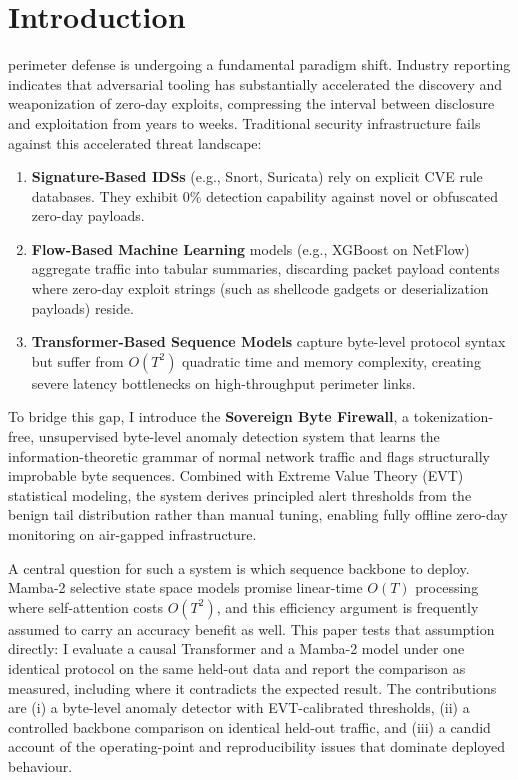\documentclass[10pt,journal,compsoc]{IEEEtran}
\begin{document}
\maketitle
\IEEEdisplaynontitleabstractindextext
\IEEEpeerreviewmaketitle

\section{Introduction}
 perimeter defense is undergoing a fundamental paradigm shift. Industry reporting indicates that adversarial tooling has substantially accelerated the discovery and weaponization of zero-day exploits, compressing the interval between disclosure and exploitation from years to weeks. Traditional security infrastructure fails against this accelerated threat landscape:

\begin{enumerate}
    \item \textbf{Signature-Based IDSs} (e.g., Snort, Suricata) rely on explicit CVE rule databases. They exhibit $0\%$ detection capability against novel or obfuscated zero-day payloads.
    \item \textbf{Flow-Based Machine Learning} models (e.g., XGBoost on NetFlow) aggregate traffic into tabular summaries, discarding packet payload contents where zero-day exploit strings (such as shellcode gadgets or deserialization payloads) reside.
    \item \textbf{Transformer-Based Sequence Models} capture byte-level protocol syntax but suffer from $O(T^2)$ quadratic time and memory complexity, creating severe latency bottlenecks on high-throughput perimeter links.
\end{enumerate}

To bridge this gap, I introduce the \textbf{Sovereign Byte Firewall}, a tokenization-free, unsupervised byte-level anomaly detection system that learns the information-theoretic grammar of normal network traffic and flags structurally improbable byte sequences. Combined with Extreme Value Theory (EVT) statistical modeling, the system derives principled alert thresholds from the benign tail distribution rather than manual tuning, enabling fully offline zero-day monitoring on air-gapped infrastructure.

A central question for such a system is which sequence backbone to deploy. Mamba-2 selective state space models promise linear-time $O(T)$ processing where self-attention costs $O(T^2)$, and this efficiency argument is frequently assumed to carry an accuracy benefit as well. This paper tests that assumption directly: I evaluate a causal Transformer and a Mamba-2 model under one identical protocol on the same held-out data and report the comparison as measured, including where it contradicts the expected result. The contributions are (i) a byte-level anomaly detector with EVT-calibrated thresholds, (ii) a controlled backbone comparison on identical held-out traffic, and (iii) a candid account of the operating-point and reproducibility issues that dominate deployed behaviour.
\end{document}
